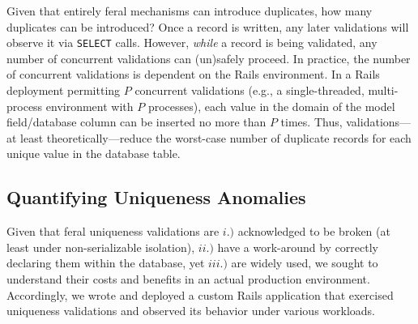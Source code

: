  Given that entirely feral
mechanisms can introduce duplicates, how many duplicates can be
introduced? Once a record is written, any later validations will
observe it via \texttt{SELECT} calls. However, \textit{while} a record
is being validated, any number of concurrent validations can
(un)safely proceed. In practice, the number of concurrent validations
is dependent on the Rails environment. In a Rails deployment
permitting $P$ concurrent validations (e.g., a single-threaded,
multi-process environment with $P$ processes), each value in the
domain of the model field/database column can be inserted no more than
$P$ times. Thus, validations---at least theoretically---reduce the
worst-case number of duplicate records for each unique value in the
database table.

\subsection{Quantifying Uniqueness Anomalies}

Given that feral uniqueness validations are $i.)$ acknowledged to be
broken (at least under non-serializable isolation), $ii.)$ have a
work-around by correctly declaring them within the database, yet
$iii.)$ are widely used, we sought to understand their costs and
benefits in an actual production environment. Accordingly, we wrote
and deployed a custom Rails application that exercised
uniqueness validations and observed its behavior under various
workloads.

